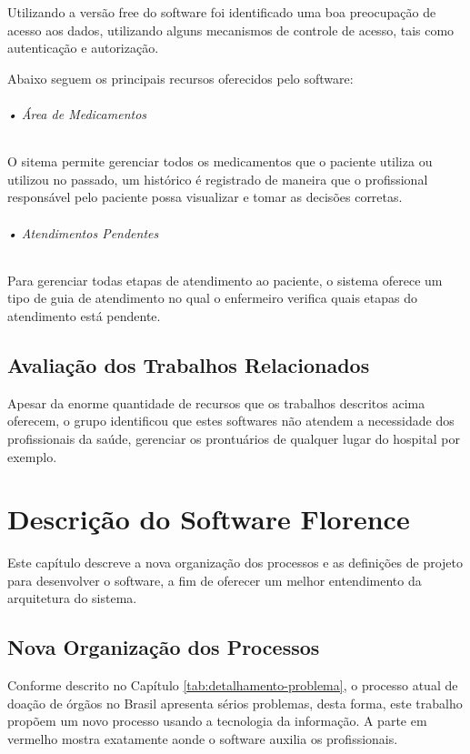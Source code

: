 \documentclass[portuguese,oneside]{tcc}
\begin{document}
Utilizando a versão free do software foi identificado uma boa preocupação de acesso aos dados, utilizando alguns mecanismos de controle de acesso, tais como autenticação e autorização.

Abaixo seguem os principais recursos oferecidos pelo software:

\subparagraph{• Área de Medicamentos}
O sitema permite gerenciar todos os medicamentos que o paciente utiliza ou utilizou no passado, um histórico é registrado de maneira que o profissional responsável pelo paciente possa visualizar e tomar as decisões corretas.

\subparagraph{• Atendimentos Pendentes}
Para gerenciar todas etapas de atendimento ao paciente, o sistema oferece um tipo de guia de atendimento no qual o enfermeiro verifica quais etapas do atendimento está pendente.

\section{Avaliação dos Trabalhos Relacionados}
Apesar da enorme quantidade de recursos que os trabalhos descritos acima oferecem, o grupo identificou que estes softwares não atendem a necessidade dos profissionais da saúde, gerenciar os prontuários de qualquer lugar do hospital por exemplo.


\chapter{Descrição do Software Florence} \label{tab:descricao-trabalho}
Este capítulo descreve a nova organização dos processos e as definições de projeto para desenvolver o software, a fim de oferecer um melhor entendimento da arquitetura do sistema.


\section{Nova Organização dos Processos}
Conforme descrito no Capítulo \ref{tab:detalhamento-problema}, o processo atual de doação de órgãos no Brasil apresenta sérios problemas, desta forma, este trabalho propõem um novo processo usando a tecnologia da informação. A parte em vermelho mostra exatamente aonde o software auxilia os profissionais.
\end{document}
